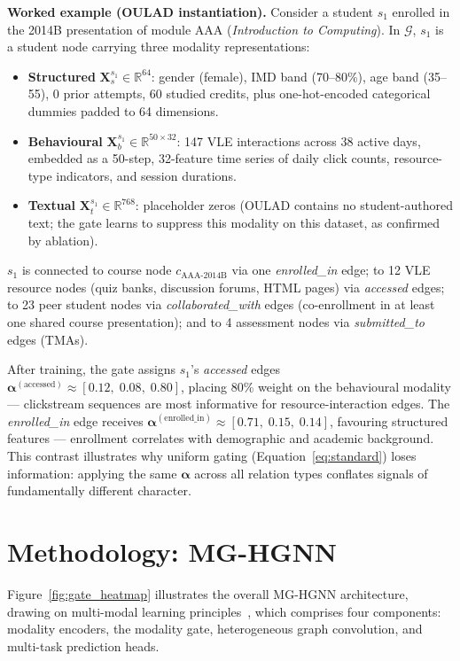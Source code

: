 \documentclass[sigconf]{acmart}
\begin{document}
\textbf{Worked example (OULAD instantiation).}
Consider a student $s_1$ enrolled in the 2014B presentation
of module AAA (\emph{Introduction to Computing}).
In $\mathcal{G}$, $s_1$ is a student node carrying three
modality representations:
\begin{itemize}
  \item \textbf{Structured} $\mathbf{X}_s^{s_1}
    \in \mathbb{R}^{64}$: gender (female), IMD band
    (70--80\%), age band (35--55), 0 prior attempts,
    60 studied credits, plus one-hot-encoded
    categorical dummies padded to 64 dimensions.
  \item \textbf{Behavioural} $\mathbf{X}_b^{s_1}
    \in \mathbb{R}^{50 \times 32}$: 147 VLE
    interactions across 38 active days, embedded as
    a 50-step, 32-feature time series of daily
    click counts, resource-type indicators, and
    session durations.
  \item \textbf{Textual} $\mathbf{X}_t^{s_1}
    \in \mathbb{R}^{768}$: placeholder zeros
    (OULAD contains no student-authored text; the
    gate learns to suppress this modality on this
    dataset, as confirmed by ablation).
\end{itemize}

$s_1$ is connected to course node
$c_{\text{AAA-2014B}}$ via one \emph{enrolled\_in}
edge; to 12 VLE resource nodes (quiz banks,
discussion forums, HTML pages) via \emph{accessed}
edges; to 23 peer student nodes via
\emph{collaborated\_with} edges (co-enrollment
in at least one shared course presentation); and to
4 assessment nodes via \emph{submitted\_to} edges
(TMAs).

After training, the gate assigns $s_1$'s
\emph{accessed} edges
$\boldsymbol{\alpha}^{(\text{accessed})} \approx
[0.12,\;0.08,\;0.80]$, placing 80\% weight on the
behavioural modality --- clickstream sequences are
most informative for resource-interaction edges.
The \emph{enrolled\_in} edge receives
$\boldsymbol{\alpha}^{(\text{enrolled\_in})} \approx
[0.71,\;0.15,\;0.14]$, favouring structured features
--- enrollment correlates with demographic and
academic background. This contrast illustrates why
uniform gating (Equation~\ref{eq:standard}) loses
information: applying the same $\boldsymbol{\alpha}$
across all relation types conflates signals of
fundamentally different character.

\section{Methodology: MG-HGNN}
\label{sec:method}
Figure~\ref{fig:gate_heatmap} illustrates the overall
MG-HGNN architecture, drawing on multi-modal learning
principles~\citep{baltrusaitis2019multimodal}, which
comprises four components: modality encoders, the
modality gate, heterogeneous graph convolution, and
multi-task prediction heads.
\end{document}
